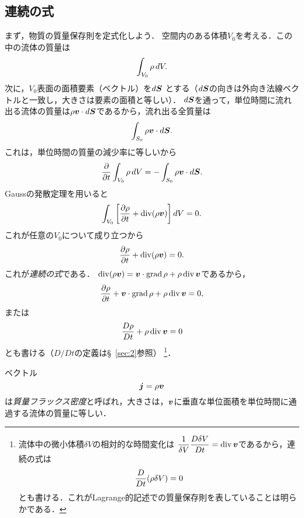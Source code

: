 \subsection*{連続の式}
まず，物質の質量保存則を定式化しよう．
空間内のある体積$V_0$を考える．この中の流体の質量は
\[
    \int_{V_0} \rho \, dV .
\]
次に，$V_0$表面の面積要素（ベクトル）を$d\vb*{S}$
とする（$d\vb*{S}$の向きは外向き法線ベクトルと一致し，大きさは要素の面積と等しい）．
$d\vb*{S}$を通って，単位時間に流れ出る流体の質量は$\rho\vb*{v}\cdot d\vb*{S}$であるから，流れ出る全質量は
\[
    \int_{S_0} \rho\vb*{v}\cdot d\vb*{S} .
\]
これは，単位時間の質量の減少率に等しいから
\begin{equation}
    \pdv{t} \int_{V_0} \rho \, dV = - \int_{S_0} \rho\vb*{v}\cdot d\vb*{S} .
\end{equation}
Gaussの発散定理を用いると
\[
    \int_{V_0} \bqty{ \pdv{\rho}{t} + \Div(\rho\v) } \dV = 0 .
\]
これが任意の$V_0$について成り立つから
\begin{equation}\label{eq1.1:連続の式}
    \pdv{\rho}{t} + \operatorname{div}(\rho\vb*{v}) = 0 .
\end{equation}
これが\emph{連続の式}である．
$\operatorname{div}(\rho\vb*{v}) = \vb*{v}\cdot \operatorname{grad} \rho + \rho \operatorname{div}\vb*{v}$であるから，
\begin{equation}
    \pdv{\rho}{t} + \vb*{v}\cdot \operatorname{grad} \rho + \rho \operatorname{div}\vb*{v} = 0,
\end{equation}
または
\[
    \frac{D \rho}{D t} + \rho \operatorname{div}\vb*{v} = 0
\]
とも書ける（$D/Dt$の定義は\S~\ref{sec:2}参照）
\footnote{流体中の微小体積$\delta V$の相対的な時間変化は
$\dfrac{1}{\delta V}\dfrac{D \delta V}{D t} = \operatorname{div}\vb*{v}$であるから，連続の式は
\[
    \frac{D }{D t} (\rho\delta V) = 0
\]
とも書ける．これがLagrange的記述での質量保存則を表していることは明らかである．}．

ベクトル
\begin{equation}
    \vb*{j} = \rho\vb*{v}
\end{equation}
は\emph{質量フラックス密度}と呼ばれ，大きさは，$\vb*{v}$に垂直な単位面積を単位時間に通過する流体の質量に等しい．



\BackToTheToc